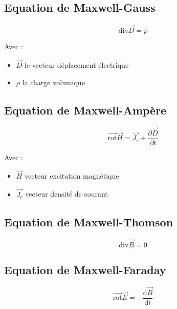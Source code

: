\documentclass[a4paper, 11pt]{article}
\newcommand{\ve}{\overrightarrow}
\newcommand{\dv}{\mathrm{div}}
\begin{document}
    \subsection{Equation de Maxwell-Gauss}

    $$\dv\ve{D} = \rho$$

    Avec :
    \begin{itemize}
        \item $\ve{D}$ le vecteur déplacement électrique
        \item $\rho$ la charge volumique
    \end{itemize}

    \subsection{Equation de Maxwell-Ampère}

    $$\ve{\mathrm{rot}}\ve{H} = \ve{J_c} + \frac{\partial\ve{D}}{\partial t}$$

    Avec :
    \begin{itemize}
        \item $\ve{H}$ vecteur excitation magnétique
        \item $\ve{J_c}$ vecteur densité de courant
    \end{itemize}

    \subsection{Equation de Maxwell-Thomson}

    $$\dv\ve{B} = 0$$


    \subsection{Equation de Maxwell-Faraday}

    $$\ve{\mathrm{rot}}\ve{E} = -\frac{\mathrm{d}\ve{B}}{\mathrm{d}t}$$
\end{document}
